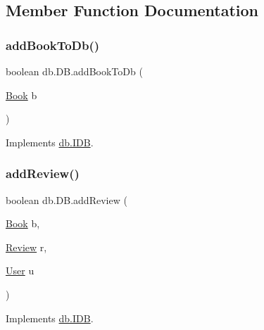 \subsection{Member Function Documentation}
\mbox{\label{classdb_1_1_d_b_a705ed9c0ffae567ec3ac09fbd7138c6f}} 
\subsubsection{\texorpdfstring{add\+Book\+To\+Db()}{addBookToDb()}}
{\footnotesize\ttfamily boolean db.\+D\+B.\+add\+Book\+To\+Db (\begin{DoxyParamCaption}\item[{\hyperlink{classserver_1_1data_1_1_book}{Book}}]{b }\end{DoxyParamCaption})}



Implements \hyperlink{interfacedb_1_1_i_d_b_a63904b26597f651ea6acbd03384e0afb}{db.\+I\+DB}.

\mbox{\label{classdb_1_1_d_b_accfa7c2f48252f167576221dc14ff721}} 
\subsubsection{\texorpdfstring{add\+Review()}{addReview()}}
{\footnotesize\ttfamily boolean db.\+D\+B.\+add\+Review (\begin{DoxyParamCaption}\item[{\hyperlink{classserver_1_1data_1_1_book}{Book}}]{b,  }\item[{\hyperlink{classserver_1_1data_1_1_review}{Review}}]{r,  }\item[{\hyperlink{classserver_1_1data_1_1_user}{User}}]{u }\end{DoxyParamCaption})}



Implements \hyperlink{interfacedb_1_1_i_d_b_a00a453c6d4fc604615f5a173d86600fc}{db.\+I\+DB}.

\mbox{\label{classdb_1_1_d_b_a8b2b9d6c4aabb17719e2d2af4cf7ba74}} 

